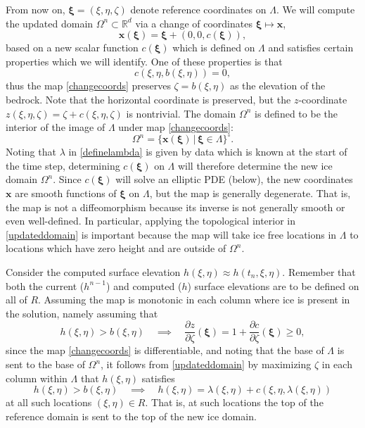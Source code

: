 \documentclass[letterpaper,final,12pt,reqno]{amsart}
\newcommand{\RR}{\mathbb{R}}
\newcommand{\bx}{\mathbf{x}}
\newcommand{\bxi}{\bm{\xi}}
\begin{document}
From now on, $\bxi=(\xi,\eta,\zeta)$ denote reference coordinates on $\Lambda$.  We will compute the updated domain $\Omega^n \subset \RR^d$ via a change of coordinates $\bxi \mapsto \bx$,
\begin{equation}
\bx(\bxi) = \bxi + (0,0,c(\bxi)), \label{changecoords}
\end{equation}
based on a new scalar function $c(\bxi)$ which is defined on $\Lambda$ and satisfies certain properties which we will identify.  One of these properties is that
\begin{equation}
c(\xi,\eta,b(\xi,\eta))=0, \label{mapbasetobase}
\end{equation}
thus the map \eqref{changecoords} preserves $\zeta=b(\xi,\eta)$ as the elevation of the bedrock.  Note that the horizontal coordinate is preserved, but the $z$-coordinate $z(\xi,\eta,\zeta)=\zeta+c(\xi,\eta,\zeta)$ is nontrivial.  The domain $\Omega^n$ is defined to be the interior of the image of $\Lambda$ under map \eqref{changecoords}:
\begin{equation}
\Omega^n = \{\bx(\bxi) \,\big|\, \bxi \in \Lambda\}^\circ. \label{updateddomain}
\end{equation}
Noting that $\lambda$ in \eqref{definelambda} is given by data which is known at the start of the time step, determining $c(\bxi)$ on $\Lambda$ will therefore determine the new ice domain $\Omega^n$.  Since $c(\bxi)$ will solve an elliptic PDE (below), the new coordinates $\bx$ are smooth functions of $\bxi$ on $\Lambda$, but the map is generally degenerate.  That is, the map is not a diffeomorphism because its inverse is not generally smooth or even well-defined.  In particular, applying the topological interior in \eqref{updateddomain} is important because the map will take ice free locations in $\Lambda$ to locations which have zero height and are outside of $\Omega^n$.

Consider the computed surface elevation $h(\xi,\eta)\approx h(t_n,\xi,\eta)$.  Remember that both the current ($h^{n-1}$) and computed ($h$) surface elevations are to be defined on all of $R$.  Assuming the map is monotonic in each column where ice is present in the solution, namely assuming that
\begin{equation}
h(\xi,\eta)>b(\xi,\eta) \quad \implies \quad \frac{\partial z}{\partial \zeta}(\bxi) = 1 + \frac{\partial c}{\partial \zeta}(\bxi) \ge 0, \label{mapmonotonic}
\end{equation}
since the map \eqref{changecoords} is differentiable, and noting that the base of $\Lambda$ is sent to the base of $\Omega^n$, it follows from \eqref{updateddomain} by maximizing $\zeta$ in each column within $\Lambda$ that $h(\xi,\eta)$ satisfies
\begin{equation}
h(\xi,\eta)>b(\xi,\eta) \quad \implies \quad h(\xi,\eta) = \lambda(\xi,\eta) + c(\xi,\eta,\lambda(\xi,\eta)) \label{maptoptotop}
\end{equation}
at all such locations $(\xi,\eta)\in R$.  That is, at such locations the top of the reference domain is sent to the top of the new ice domain.
\end{document}
